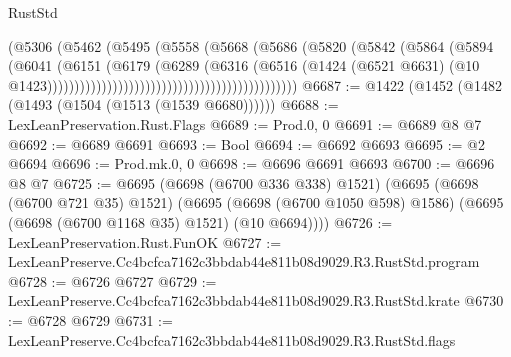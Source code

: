 \begin{lexlean}{RustStd}
\begin{coremodule}
                                                            (@5306
                                                              (@5462
                                                                (@5495
                                                                  (@5558
                                                                    (@5668
                                                                      (@5686
                                                                        (@5820
                                                                          (@5842
                                                                            (@5864
                                                                              (@5894
                                                                                (@6041
                                                                                  (@6151
                                                                                    (@6179
                                                                                      (@6289
                                                                                        (@6316
                                                                                          (@6516
                                                                                            (@1424
                                                                                              (@6521
                                                                                                @6631)
                                                                                              (@10
                                                                                                @1423))))))))))))))))))))))))))))))))))))))))))))))
@6687 := @1422 (@1452 (@1482 (@1493 (@1504 (@1513 (@1539 @6680))))))
@6688 := LexLeanPreservation.Rust.Flags
@6689 := Prod.{0, 0}
@6691 := @6689 @8 @7
@6692 := @6689 @6691
@6693 := Bool
@6694 := @6692 @6693
@6695 := @2 @6694
@6696 := Prod.mk.{0, 0}
@6698 := @6696 @6691 @6693
@6700 := @6696 @8 @7
@6725 := @6695
    (@6698 (@6700 @336 @338) @1521)
    (@6695
      (@6698 (@6700 @721 @35) @1521)
      (@6695 (@6698 (@6700 @1050 @598) @1586) (@6695 (@6698 (@6700 @1168 @35) @1521) (@10 @6694))))
@6726 := LexLeanPreservation.Rust.FunOK
@6727 := LexLeanPreserve.Cc4bcfca7162c3bbdab44e811b08d9029.R3.RustStd.program
@6728 := @6726 @6727
@6729 := LexLeanPreserve.Cc4bcfca7162c3bbdab44e811b08d9029.R3.RustStd.krate
@6730 := @6728 @6729
@6731 := LexLeanPreserve.Cc4bcfca7162c3bbdab44e811b08d9029.R3.RustStd.flags

\end{coremodule}
\end{lexlean}
